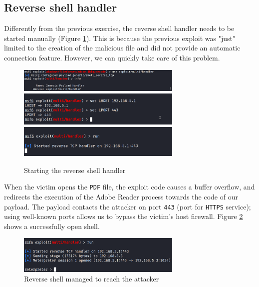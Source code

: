 \subsection{Reverse shell handler}
\label{subsec:ex3:reverse-shell-handler}

Differently from the previous exercise, the reverse shell handler needs to be started manually (Figure \ref{fig:ex3:reverse-shell-handler}). This is because the previous exploit was "just" limited to the creation of the malicious file and did not provide an automatic connection feature. However, we can quickly take care of this problem.

\begin{figure}[htbp]
    \centering
    \includegraphics[width=0.7\textwidth]{../drawable/exercise_3_screenshots/generic_payload_handler.png}
    \includegraphics[width=0.7\textwidth]{../drawable/exercise_3_screenshots/set_handler_parameters.png}
    \includegraphics[width=0.7\textwidth]{../drawable/exercise_3_screenshots/handler_listening.png}
    \caption{Starting the reverse shell handler}
    \label{fig:ex3:reverse-shell-handler}
\end{figure}

When the victim opens the \texttt{PDF} file, the exploit code causes a buffer overflow, and redirects the execution of the Adobe Reader process towards the code of our payload. The payload contacts the attacker on port \texttt{443} (port for \texttt{HTTPS} service); using well-known ports allows us to bypass the victim's host firewall. Figure \ref{fig:ex3:reverse-shell-opened} shows a successfully open shell.

\begin{figure}[htbp]
    \centering
    \includegraphics[width=0.7\textwidth]{../drawable/exercise_3_screenshots/meterpreter_opened.png}
    \caption{Reverse shell managed to reach the attacker}
    \label{fig:ex3:reverse-shell-opened}
\end{figure}

